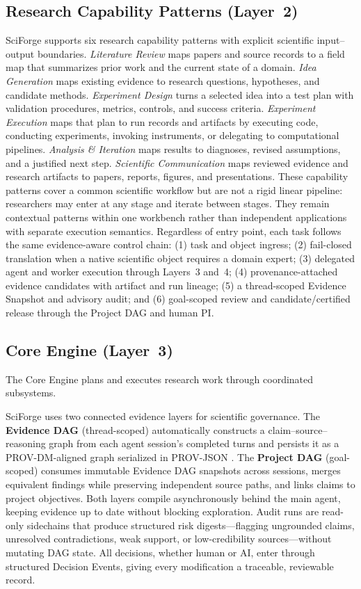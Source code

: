 \documentclass[sn-basic,Numbered,pdflatex]{sn-jnl}
\begin{document}
\subsection{Research Capability Patterns (Layer~2)}
SciForge supports six research capability patterns with explicit scientific input--output boundaries. \emph{Literature Review} maps papers and source records to a field map that summarizes prior work and the current state of a domain. \emph{Idea Generation} maps existing evidence to research questions, hypotheses, and candidate methods. \emph{Experiment Design} turns a selected idea into a test plan with validation procedures, metrics, controls, and success criteria. \emph{Experiment Execution} maps that plan to run records and artifacts by executing code, conducting experiments, invoking instruments, or delegating to computational pipelines. \emph{Analysis \& Iteration} maps results to diagnoses, revised assumptions, and a justified next step. \emph{Scientific Communication} maps reviewed evidence and research artifacts to papers, reports, figures, and presentations. These capability patterns cover a common scientific workflow but are not a rigid linear pipeline: researchers may enter at any stage and iterate between stages. They remain contextual patterns within one workbench rather than independent applications with separate execution semantics. Regardless of entry point, each task follows the same evidence-aware control chain: (1) task and object ingress; (2) fail-closed translation when a native scientific object requires a domain expert; (3) delegated agent and worker execution through Layers~3 and~4; (4) provenance-attached evidence candidates with artifact and run lineage; (5) a thread-scoped Evidence Snapshot and advisory audit; and (6) goal-scoped review and candidate/certified release through the Project DAG and human PI.

\subsection{Core Engine (Layer~3)}
The Core Engine plans and executes research work through coordinated subsystems.

SciForge uses two connected evidence layers for scientific governance. The \textbf{Evidence DAG} (thread-scoped) automatically constructs a claim--source--reasoning graph from each agent session's completed turns and persists it as a PROV-DM-aligned graph serialized in PROV-JSON \cite{w3cprov2013,huynh2013provjson}. The \textbf{Project DAG} (goal-scoped) consumes immutable Evidence DAG snapshots across sessions, merges equivalent findings while preserving independent source paths, and links claims to project objectives. Both layers compile asynchronously behind the main agent, keeping evidence up to date without blocking exploration. Audit runs are read-only sidechains that produce structured risk digests---flagging ungrounded claims, unresolved contradictions, weak support, or low-credibility sources---without mutating DAG state. All decisions, whether human or AI, enter through structured Decision Events, giving every modification a traceable, reviewable record.
\end{document}
